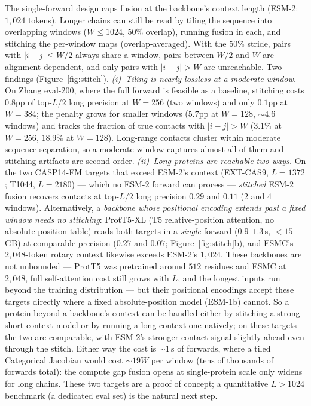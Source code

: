 \documentclass{article}
\begin{document}
The single-forward design caps fusion at the backbone's context length
(ESM-2: $1{,}024$ tokens). Longer chains can still be read by tiling the
sequence into overlapping windows ($W\leq1024$, $50\%$ overlap), running
fusion in each, and stitching the per-window maps (overlap-averaged). With
the $50\%$ stride, pairs with $|i-j|\leq W/2$ always share a window, pairs
between $W/2$ and $W$ are alignment-dependent, and only pairs with
$|i-j|>W$ are unreachable.
Two findings (Figure~\ref{fig:stitch}).
\emph{(i)~Tiling is nearly lossless at a moderate window.} On Zhang
eval-200, where the full forward is feasible as a baseline, stitching costs
$0.8$pp of top-$L/2$ long precision at $W{=}256$ (two windows) and only
$0.1$pp at $W{=}384$; the penalty grows for smaller windows ($5.7$pp at
$W{=}128$, ${\sim}4.6$ windows) and tracks the fraction of true contacts
with $|i-j|>W$ ($3.1\%$ at $W{=}256$, $18.9\%$ at $W{=}128$). Long-range
contacts cluster within moderate sequence separation, so a moderate window
captures almost all of them and stitching artifacts are second-order.
\emph{(ii)~Long proteins are reachable two ways.} On the two CASP14-FM
targets that exceed ESM-2's context (EXT-CAS9, $L{=}1372$; T1044,
$L{=}2180$) --- which no ESM-2 forward can process --- \emph{stitched} ESM-2
fusion recovers contacts at top-$L/2$ long precision $0.29$ and $0.11$ (2
and 4 windows). Alternatively, a \emph{backbone whose positional encoding extends past a
fixed window needs no stitching}: ProtT5-XL (T5 relative-position attention,
no absolute-position table) reads both targets in a \emph{single} forward
($0.9$--$1.3$\,s, $<15$\,GB) at comparable precision ($0.27$ and $0.07$;
Figure~\ref{fig:stitch}b), and ESMC's $2{,}048$-token rotary context
likewise exceeds ESM-2's $1{,}024$. These backbones are not unbounded ---
ProtT5 was pretrained around $512$ residues and ESMC at $2{,}048$, full
self-attention cost still grows with $L$, and the longest inputs run beyond
the training distribution --- but their positional encodings accept these
targets directly where a fixed absolute-position model (ESM-1b) cannot. So a protein
beyond a backbone's context can be handled either by stitching a strong
short-context model or by running a long-context one natively; on these
targets the two are comparable, with ESM-2's stronger contact signal
slightly ahead even through the stitch. Either way the cost is $\sim$1\,s
of forwards, where a tiled Categorical Jacobian would cost $\sim 19W$ per
window (tens of thousands of forwards total): the compute gap fusion opens
at single-protein scale only widens for long chains. These two targets are
a proof of concept; a quantitative $L{>}1024$ benchmark (a dedicated eval
set) is the natural next step.
\end{document}

